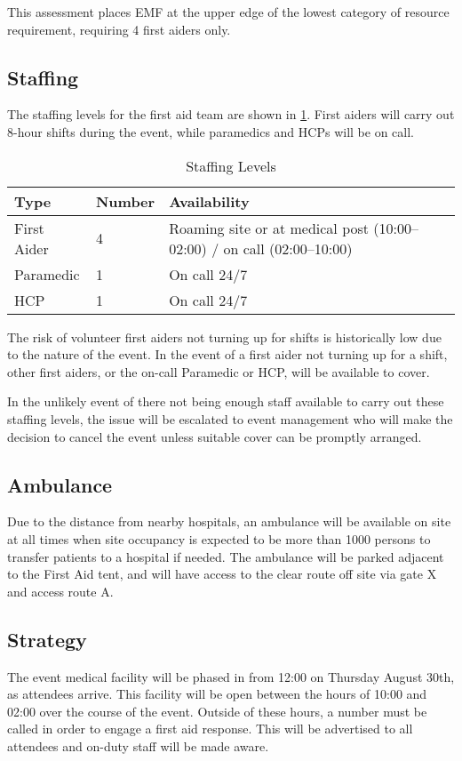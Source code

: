 This assessment places EMF at the upper edge of the lowest category of resource
requirement, requiring 4 first aiders only.

\subsection{Staffing}

The staffing levels for the first aid team are shown in \cref{table:fastaffing}.
First aiders will carry out 8-hour shifts during the event, while paramedics
and HCPs will be on call.

\begin{table}[h!]
\caption{Staffing Levels}
\label{table:fastaffing}
\centering
\begin{tabular}{| l l l |}
    \hline
        \textbf{Type} & \textbf{Number} & \textbf{Availability} \\
    \hline
        First Aider & 4 & Roaming site or at medical post (10:00--02:00) / on call (02:00--10:00) \\
        Paramedic & 1 & On call 24/7 \\
        HCP & 1 & On call 24/7 \\
    \hline
\end{tabular}
\end{table}

The risk of volunteer first aiders not turning up for shifts is historically low due
to the nature of the event. In the event of a first aider not turning up for a shift,
other first aiders, or the on-call Paramedic or HCP, will be available to cover.

In the unlikely event of there not being enough staff available to carry out these
staffing levels, the issue will be escalated to event management who will make the
decision to cancel the event unless suitable cover can be promptly arranged.

\subsection{Ambulance}

Due to the distance from nearby hospitals, an ambulance will be available on site
at all times when site occupancy is expected to be more than 1000 persons to transfer
patients to a hospital if needed. The ambulance will be parked adjacent to the First Aid
tent, and will have access to the clear route off site via gate X and access route A.

\subsection{Strategy}
The event medical facility will be phased in from 12:00 on Thursday August 30th,
as attendees arrive. This facility will be open between the hours of 10:00 and 02:00
over the course of the event. Outside of these hours, a number must be called in
order to engage a first aid response. This will be advertised to all attendees and
on-duty staff will be made aware.

